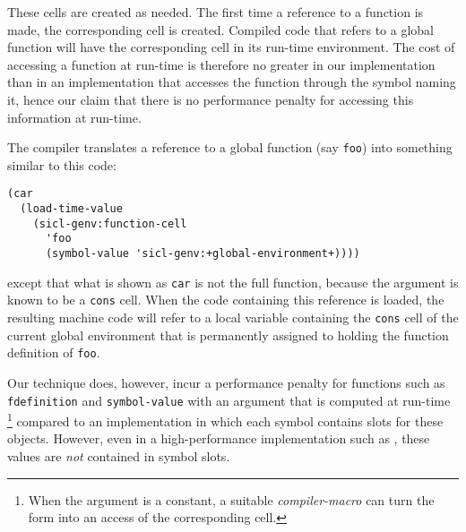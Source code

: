 These cells are created as needed.  The first time a reference to a
function is made, the corresponding cell is created.  Compiled code
that refers to a global function will have the corresponding cell in
its run-time environment.  The cost of accessing a function at
run-time is therefore no greater in our implementation than in an
implementation that accesses the function through the symbol naming
it, hence our claim that there is no performance penalty for accessing
this information at run-time.

The \sicl{} compiler translates a reference to a global function (say
\texttt{foo}) into something similar to this code:

{\small\begin{verbatim}
(car
  (load-time-value
    (sicl-genv:function-cell
      'foo
      (symbol-value 'sicl-genv:+global-environment+))))
\end{verbatim}}

except that what is shown as \texttt{car} is not the full
\commonlisp{} function, because the argument is known to be a
\texttt{cons} cell.  When the code containing this reference is
loaded, the resulting machine code will refer to a local variable
containing the \texttt{cons} cell of the current global environment
that is permanently assigned to holding the function definition of
\texttt{foo}.

Our technique does, however, incur a performance penalty for functions
such as \texttt{fdefinition} and \texttt{symbol-value} with an
argument that is computed at run-time%
\footnote{When the argument is a constant, a suitable
  \emph{compiler-macro} can turn the form into an access of the
  corresponding cell.}
compared to an implementation in which each symbol contains slots for
these objects.  However, even in a high-performance implementation such
as \sbcl{}, these values are \emph{not} contained in symbol slots.

